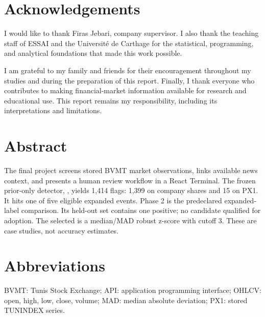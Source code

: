 \documentclass[12pt,a4paper]{article}
\newif\iftotalpagecount
\begin{document}
\iftotalpagecount
  \pagenumbering{arabic}
\else
\fi
\makereportcover

\iftotalpagecount
  \setcounter{page}{2}
\else
  \setcounter{page}{2}
\fi

\section*{Acknowledgements}
I would like to thank Firas Jebari, company supervisor. I also thank the
teaching staff of ESSAI and the Université de Carthage for the statistical,
programming, and analytical foundations that made this work possible.

I am grateful to my family and friends for their encouragement throughout my
studies and during the preparation of this report. Finally, I thank everyone
who contributes to making financial-market information available for research
and educational use.
\vfill
This report remains my responsibility, including its interpretations and
limitations.
\clearpage

\tableofcontents
\thispagestyle{plain}
\section*{Abstract}
The final project screens stored BVMT market observations, links available
news context, and presents a human review workflow in a React Terminal.
The frozen prior-only detector, , yields 1,414 flags:
1,399 on company shares and 15 on PX1. It hits one of five eligible
expanded events. Phase 2 is the predeclared expanded-label comparison. Its held-out set
contains one positive; no candidate qualified for adoption. The selected
 is a median/MAD robust z-score with cutoff 3. These are case studies, not accuracy estimates.
\section*{Abbreviations}
\small BVMT: Tunis Stock Exchange; API: application programming interface;
OHLCV: open, high, low, close, volume; MAD: median absolute deviation;
PX1: stored TUNINDEX series.\normalsize
\listoffigures
\listoftables
\clearpage

\iftotalpagecount
  \setcounter{page}{4}
\else
  \setcounter{page}{1}
\fi

\end{document}
